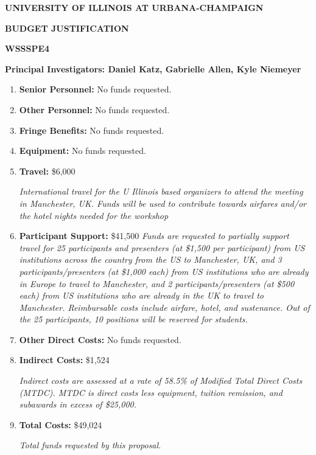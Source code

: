 \documentclass[11pt]{article}
\begin{document}
\newpage




\newpage

{\bf UNIVERSITY OF ILLINOIS AT URBANA-CHAMPAIGN}

{\bf BUDGET JUSTIFICATION}

{\bf WSSSPE4}

{\bf Principal Investigators: Daniel Katz, Gabrielle Allen, Kyle Niemeyer}

\begin{enumerate}[label=\bf \Alph*.,leftmargin=*]

\item {\bf Senior Personnel: } No funds requested.

\item {\bf Other Personnel: } No funds requested.
\item {\bf Fringe Benefits: }  No funds requested. 
\item {\bf Equipment: }  No funds requested. 
\item {\bf Travel: } \$6,000

{\it International travel for the U Illinois based organizers to attend the meeting in Manchester, UK. Funds will be used to contribute towards airfares and/or the hotel nights needed for the workshop}

\item {\bf Participant Support: } \$41,500
{\it Funds are requested to partially support travel for 25 participants and presenters (at \$1,500 per participant) from US institutions across the country from the US to Manchester, UK, and 3 participants/presenters (at \$1,000 each)  from US institutions who are already in Europe to travel to Manchester, and 2 participants/presenters  (at \$500 each)  from US institutions who are already in the UK to travel to Manchester. Reimbursable costs include airfare, hotel, and sustenance.
Out of the 25 participants, 10 positions will be reserved for students.}

\item {\bf Other Direct Costs: } No funds requested. 
\item {\bf Indirect Costs: } \$1,524

{\it Indirect costs are assessed at a rate of 58.5\% of Modified Total Direct Costs (MTDC). MTDC is direct costs less equipment, tuition remission, and subawards in excess of \$25,000. }

\item {\bf Total Costs: } \$49,024

{\it Total funds requested by this proposal. }


\end{enumerate}
\end{document}
